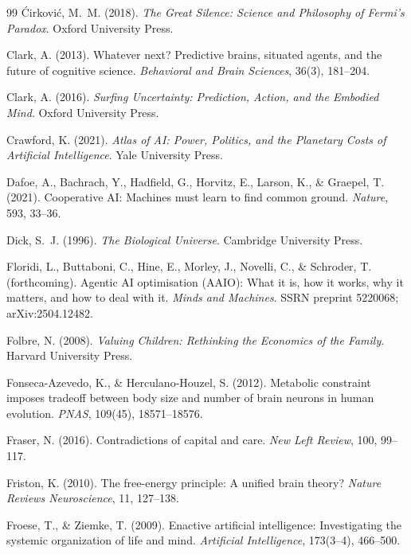 \documentclass[11pt,a4paper,twocolumn]{article}
\begin{document}
\begin{thebibliography}{99}
 \'{C}irkovi\'{c}, M.~M. (2018). \textit{The Great Silence: Science and Philosophy of Fermi's Paradox}. Oxford University Press.

 Clark, A. (2013). Whatever next? Predictive brains, situated agents, and the future of cognitive science. \textit{Behavioral and Brain Sciences}, 36(3), 181--204.

 Clark, A. (2016). \textit{Surfing Uncertainty: Prediction, Action, and the Embodied Mind}. Oxford University Press.

 Crawford, K. (2021). \textit{Atlas of AI: Power, Politics, and the Planetary Costs of Artificial Intelligence}. Yale University Press.

 Dafoe, A., Bachrach, Y., Hadfield, G., Horvitz, E., Larson, K., \& Graepel, T. (2021). Cooperative AI: Machines must learn to find common ground. \textit{Nature}, 593, 33--36.

 Dick, S.~J. (1996). \textit{The Biological Universe}. Cambridge University Press.

 Floridi, L., Buttaboni, C., Hine, E., Morley, J., Novelli, C., \& Schroder, T. (forthcoming). Agentic AI optimisation (AAIO): What it is, how it works, why it matters, and how to deal with it. \textit{Minds and Machines}. SSRN preprint 5220068; arXiv:2504.12482.

 Folbre, N. (2008). \textit{Valuing Children: Rethinking the Economics of the Family}. Harvard University Press.

 Fonseca-Azevedo, K., \& Herculano-Houzel, S. (2012). Metabolic constraint imposes tradeoff between body size and number of brain neurons in human evolution. \textit{PNAS}, 109(45), 18571--18576.

 Fraser, N. (2016). Contradictions of capital and care. \textit{New Left Review}, 100, 99--117.

 Friston, K. (2010). The free-energy principle: A unified brain theory? \textit{Nature Reviews Neuroscience}, 11, 127--138.

 Froese, T., \& Ziemke, T. (2009). Enactive artificial intelligence: Investigating the systemic organization of life and mind. \textit{Artificial Intelligence}, 173(3--4), 466--500.


\end{thebibliography}
\end{document}
